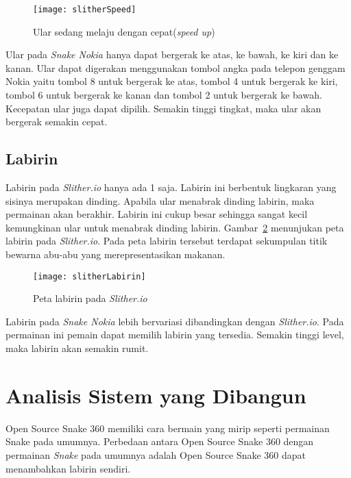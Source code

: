 \begin{figure}[H]
	\centering  
	\texttt{[image: slitherSpeed]}  
	\caption[Ular sedang melaju dengan cepat(\textit{speed up})]{Ular sedang melaju dengan cepat(\textit{speed up})}
	\label{fig:slitherSpeed} 
\end{figure}

Ular pada \textit{Snake Nokia} hanya dapat bergerak ke atas, ke bawah, ke kiri dan ke kanan. Ular dapat digerakan menggunakan tombol angka pada telepon genggam Nokia yaitu tombol 8 untuk bergerak ke atas, tombol 4 untuk bergerak ke kiri, tombol 6 untuk bergerak ke kanan dan tombol 2 untuk bergerak ke bawah. Kecepatan ular juga dapat dipilih. Semakin tinggi tingkat, maka ular akan bergerak semakin cepat.

\subsection{Labirin}
Labirin pada \textit{Slither.io} hanya ada 1 saja. Labirin ini berbentuk lingkaran yang sisinya merupakan dinding. Apabila ular menabrak dinding labirin, maka permainan akan berakhir. Labirin ini cukup besar sehingga sangat kecil kemungkinan ular untuk menabrak dinding labirin. Gambar~\ref{fig:slitherLabirin} menunjukan peta labirin pada \textit{Slither.io}. Pada peta labirin tersebut terdapat sekumpulan titik bewarna abu-abu yang merepresentasikan makanan.

\begin{figure}[H]
	\centering  
	\texttt{[image: slitherLabirin]}  
	\caption[Peta labirin pada \textit{Slither.io}]{Peta labirin pada \textit{Slither.io}}
	\label{fig:slitherLabirin} 
\end{figure}

Labirin pada \textit{Snake Nokia} lebih bervariasi dibandingkan dengan \textit{Slither.io}. Pada permainan ini pemain dapat memilih labirin yang tersedia. Semakin tinggi level, maka labirin akan semakin rumit. 

\section{Analisis Sistem yang Dibangun}
Open Source Snake 360 memiliki cara bermain yang mirip seperti permainan Snake pada umumnya. Perbedaan antara Open Source Snake 360 dengan permainan \textit{Snake} pada umumnya adalah Open Source Snake 360 dapat menambahkan labirin sendiri. 

